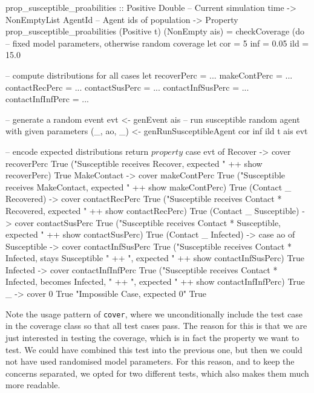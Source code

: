 \begin{HaskellCode}
prop_susceptible_proabilities :: Positive Double      -- Current simulation time
                              -> NonEmptyList AgentId -- Agent ids of population
                              -> Property
prop_susceptible_proabilities (Positive t) (NonEmpty ais) = checkCoverage (do
  -- fixed model parameters, otherwise random coverage
  let cor = 5
      inf = 0.05
      ild = 15.0

   -- compute distributions for all cases
  let recoverPerc       = ...
      makeContPerc      = ...
      contactRecPerc    = ...
      contactSusPerc    = ...
      contactInfSusPerc = ...
      contactInfInfPerc = ...

  -- generate a random event
  evt <- genEvent ais
  -- run susceptible random agent with given parameters
  (_, ao, _) <- genRunSusceptibleAgent cor inf ild t ais evt

  -- encode expected distributions
  return $ property $
    case evt of 
      Recover -> 
        cover recoverPerc True 
          ("Susceptible receives Recover, expected " ++ 
           show recoverPerc) True
      MakeContact -> 
        cover makeContPerc True 
          ("Susceptible receives MakeContact, expected " ++ 
           show makeContPerc) True
      (Contact _ Recovered) -> 
        cover contactRecPerc True 
          ("Susceptible receives Contact * Recovered, expected " ++ 
           show contactRecPerc) True
      (Contact _ Susceptible) -> 
        cover contactSusPerc True 
          ("Susceptible receives Contact * Susceptible, expected " ++ 
           show contactSusPerc) True
      (Contact _ Infected) -> 
        case ao of
          Susceptible ->
            cover contactInfSusPerc True 
              ("Susceptible receives Contact * Infected, stays Susceptible " ++
               ", expected " ++ show contactInfSusPerc) True
          Infected ->
            cover contactInfInfPerc True 
              ("Susceptible receives Contact * Infected, becomes Infected, " ++
               ", expected " ++ show contactInfInfPerc) True
          _ ->
            cover 0 True "Impossible Case, expected 0" True
\end{HaskellCode}

Note the usage pattern of \texttt{cover}, where we unconditionally include the test case in the coverage class so that all test cases pass. The reason for this is that we are just interested in testing the coverage, which is in fact the property we want to test. We could have combined this test into the previous one, but then we could not have used randomised model parameters. For this reason, and to keep the concerns separated, we opted for two different tests, which also makes them much more readable.

